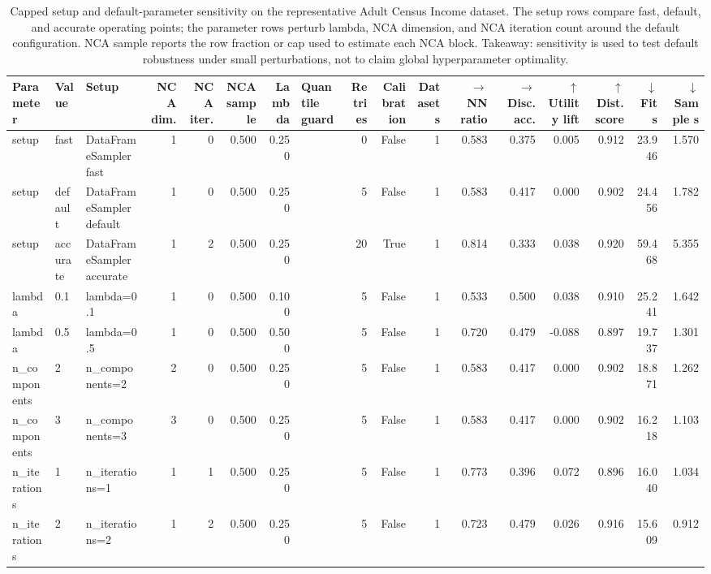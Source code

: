 \begin{table}
\caption{Capped setup and default-parameter sensitivity on the representative Adult Census Income dataset. The setup rows compare fast, default, and accurate operating points; the parameter rows perturb lambda, NCA dimension, and NCA iteration count around the default configuration. NCA sample reports the row fraction or cap used to estimate each NCA block. Takeaway: sensitivity is used to test default robustness under small perturbations, not to claim global hyperparameter optimality.}
\label{tab:sensitivity-validation}
\begin{adjustbox}{max width=\textwidth}
\begin{tabular}{lllrrrrlrrrrrrrrr}
\toprule
Parameter & Value & Setup & NCA dim. & NCA iter. & NCA sample & Lambda & Quantile guard & Retries & Calibration & Datasets & $\rightarrow$ NN ratio & $\rightarrow$ Disc. acc. & $\uparrow$ Utility lift & $\uparrow$ Dist. score & $\downarrow$ Fit s & $\downarrow$ Sample s \\
\midrule
setup & fast & DataFrameSampler fast & 1 & 0 & 0.500 & 0.250 &  & 0 & False & 1 & 0.583 & 0.375 & 0.005 & 0.912 & 23.946 & 1.570 \\
setup & default & DataFrameSampler default & 1 & 0 & 0.500 & 0.250 &  & 5 & False & 1 & 0.583 & 0.417 & 0.000 & 0.902 & 24.456 & 1.782 \\
setup & accurate & DataFrameSampler accurate & 1 & 2 & 0.500 & 0.250 &  & 20 & True & 1 & 0.814 & 0.333 & 0.038 & 0.920 & 59.468 & 5.355 \\
lambda & 0.1 & lambda=0.1 & 1 & 0 & 0.500 & 0.100 &  & 5 & False & 1 & 0.533 & 0.500 & 0.038 & 0.910 & 25.241 & 1.642 \\
lambda & 0.5 & lambda=0.5 & 1 & 0 & 0.500 & 0.500 &  & 5 & False & 1 & 0.720 & 0.479 & -0.088 & 0.897 & 19.737 & 1.301 \\
n\_components & 2 & n\_components=2 & 2 & 0 & 0.500 & 0.250 &  & 5 & False & 1 & 0.583 & 0.417 & 0.000 & 0.902 & 18.871 & 1.262 \\
n\_components & 3 & n\_components=3 & 3 & 0 & 0.500 & 0.250 &  & 5 & False & 1 & 0.583 & 0.417 & 0.000 & 0.902 & 16.218 & 1.103 \\
n\_iterations & 1 & n\_iterations=1 & 1 & 1 & 0.500 & 0.250 &  & 5 & False & 1 & 0.773 & 0.396 & 0.072 & 0.896 & 16.040 & 1.034 \\
n\_iterations & 2 & n\_iterations=2 & 1 & 2 & 0.500 & 0.250 &  & 5 & False & 1 & 0.723 & 0.479 & 0.026 & 0.916 & 15.609 & 0.912 \\
\bottomrule
\end{tabular}
\end{adjustbox}
\end{table}
